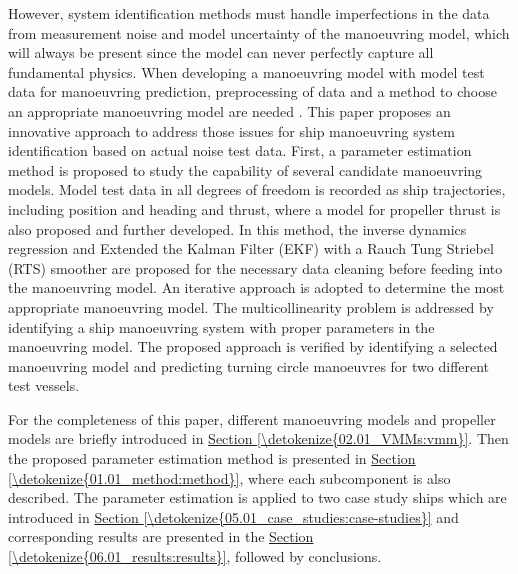 \documentclass[review]{elsarticle}
\begin{document}
\sphinxAtStartPar
However, system identification methods must handle imperfections in the data from measurement noise and model uncertainty of the manoeuvring model, which will always be present since the model can never perfectly capture all fundamental physics. When developing a manoeuvring model with model test data for manoeuvring prediction, preprocessing of data and a method to choose an appropriate manoeuvring model are needed \cite{alexandersson_comparison_2022}.
This paper proposes an innovative approach to address those issues for ship manoeuvring system identification based on actual noise test data. First, a parameter estimation method  is proposed to study the capability of several candidate manoeuvring models. Model test data in all degrees of freedom is recorded as ship trajectories, including position and heading and thrust, where a model for propeller thrust is also proposed and further developed. In this method, the inverse dynamics regression and Extended the Kalman Filter (EKF) with a Rauch Tung Striebel (RTS) smoother \cite{rauch_maximum_1965} are proposed for the necessary data cleaning before feeding into the manoeuvring model. An iterative approach is adopted to determine the most appropriate manoeuvring model. The multicollinearity problem is addressed by identifying a ship manoeuvring system with proper parameters in the manoeuvring model. The proposed approach is verified by identifying a selected manoeuvring model and predicting turning circle manoeuvres for two different test vessels.

\sphinxAtStartPar
For the completeness of this paper, different manoeuvring models and propeller models are briefly introduced in \hyperref[\detokenize{02.01_VMMs:vmm}]{Section \ref{\detokenize{02.01_VMMs:vmm}}}. Then the proposed parameter estimation method is presented in \hyperref[\detokenize{01.01_method:method}]{Section \ref{\detokenize{01.01_method:method}}}, where each subcomponent is also described. The parameter estimation is applied to two case study ships which are introduced in \hyperref[\detokenize{05.01_case_studies:case-studies}]{Section \ref{\detokenize{05.01_case_studies:case-studies}}} and corresponding results are presented in the \hyperref[\detokenize{06.01_results:results}]{Section \ref{\detokenize{06.01_results:results}}}, followed by conclusions.
\end{document}
